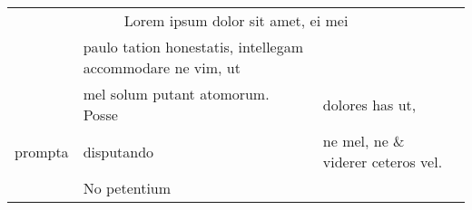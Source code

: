 \documentclass{article}
\begin{document}
\begin{table}[tbp]
  \begin{tabular}{llll}
    \multicolumn{4}{c}{Lorem ipsum dolor sit amet, ei mei} \\
    & paulo tation honestatis,
      intellegam accommodare ne vim, ut \\
    & mel solum putant atomorum. Posse & dolores has ut, \\
    prompta & disputando & ne mel, ne
                           \& viderer ceteros vel. \\
    & No petentium
  \end{tabular}
\end{table}
\end{document}
